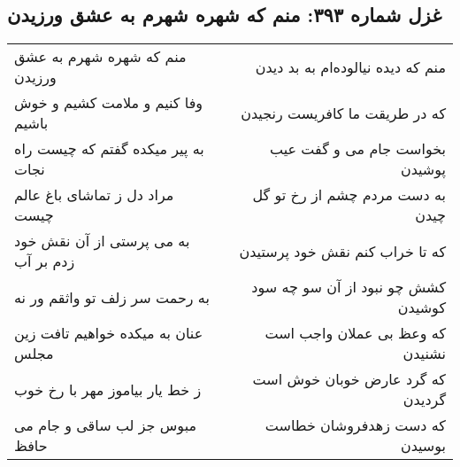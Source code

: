 \begin{center}
\section*{غزل شماره ۳۹۳: منم که شهره شهرم به عشق ورزیدن}
\label{sec:sh393}
\begin{longtable}{l p{0.5cm} r}
منم که شهره شهرم به عشق ورزیدن
&&
منم که دیده نیالوده‌ام به بد دیدن
\\
وفا کنیم و ملامت کشیم و خوش باشیم
&&
که در طریقت ما کافریست رنجیدن
\\
به پیر میکده گفتم که چیست راه نجات
&&
بخواست جام می و گفت عیب پوشیدن
\\
مراد دل ز تماشای باغ عالم چیست
&&
به دست مردم چشم از رخ تو گل چیدن
\\
به می پرستی از آن نقش خود زدم بر آب
&&
که تا خراب کنم نقش خود پرستیدن
\\
به رحمت سر زلف تو واثقم ور نه
&&
کشش چو نبود از آن سو چه سود کوشیدن
\\
عنان به میکده خواهیم تافت زین مجلس
&&
که وعظ بی عملان واجب است نشنیدن
\\
ز خط یار بیاموز مهر با رخ خوب
&&
که گرد عارض خوبان خوش است گردیدن
\\
مبوس جز لب ساقی و جام می حافظ
&&
که دست زهدفروشان خطاست بوسیدن
\\
\end{longtable}
\end{center}
